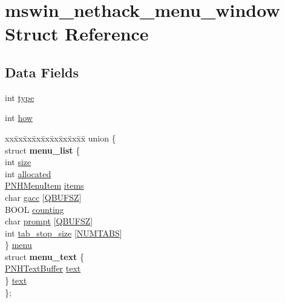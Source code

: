 \hypertarget{structmswin__nethack__menu__window}{\section{mswin\+\_\+nethack\+\_\+menu\+\_\+window Struct Reference}
\label{structmswin__nethack__menu__window}
}
\subsection*{Data Fields}
\begin{DoxyCompactItemize}
\item 
int \hyperlink{structmswin__nethack__menu__window_ab0fda81d90930a6d45dd16aeb8ce4f8a}{type}
\item 
int \hyperlink{structmswin__nethack__menu__window_aa165ee77989c4e4cec77f8ce58ca27b9}{how}
\item 
\begin{tabbing}
xx\=xx\=xx\=xx\=xx\=xx\=xx\=xx\=xx\=\kill
union \{\\
\>struct {\bfseries menu\_list} \{\\
\>\>int \hyperlink{structmswin__nethack__menu__window_a6ab2f42967e27213b53e9c1326b185b4}{size}\\
\>\>int \hyperlink{structmswin__nethack__menu__window_a5a753230e20c85057c3f164e1dba7da7}{allocated}\\
\>\>\hyperlink{sys_2wince_2mhmenu_8c_aaac97a082e26a50927b1796fd38fc7e2}{PNHMenuItem} \hyperlink{structmswin__nethack__menu__window_a4fa6602eb4a3e8e22b7d2248e49c35c4}{items}\\
\>\>char \hyperlink{structmswin__nethack__menu__window_a2cd3566e25e8ecfa1cd0fa3c79517a1d}{gacc} \mbox{[}\hyperlink{global_8h_a1bb6bf3db7bf52ca1e9fa8fbcd6e9630}{QBUFSZ}\mbox{]}\\
\>\>BOOL \hyperlink{structmswin__nethack__menu__window_aa60c482ee621ddd3472cfe6ea4c63bf5}{counting}\\
\>\>char \hyperlink{structmswin__nethack__menu__window_a947012a8d256d201c533bb2a9db2e025}{prompt} \mbox{[}\hyperlink{global_8h_a1bb6bf3db7bf52ca1e9fa8fbcd6e9630}{QBUFSZ}\mbox{]}\\
\>\>int \hyperlink{structmswin__nethack__menu__window_ab8f612d29db613381b4982fc2f4d620a}{tab\_stop\_size} \mbox{[}\hyperlink{win_2win32_2mhmenu_8c_a2431d5b90e503a443a8e29c37a5ef549}{NUMTABS}\mbox{]}\\
\>\} \hyperlink{structmswin__nethack__menu__window_a8da0ac3642664655477707181c2b4284}{menu}\\
\>struct {\bfseries menu\_text} \{\\
\>\>\hyperlink{mhtxtbuf_8c_a1dd05af79bf8ee000da64ac915b745b1}{PNHTextBuffer} \hyperlink{structmswin__nethack__menu__window_ac6c6169f2aa8de6b303db695539d770a}{text}\\
\>\} \hyperlink{structmswin__nethack__menu__window_a4b38bb96851eb566dd0859b3353d6257}{text}\\
\}; \\


\end{tabbing}
\end{DoxyCompactItemize}
